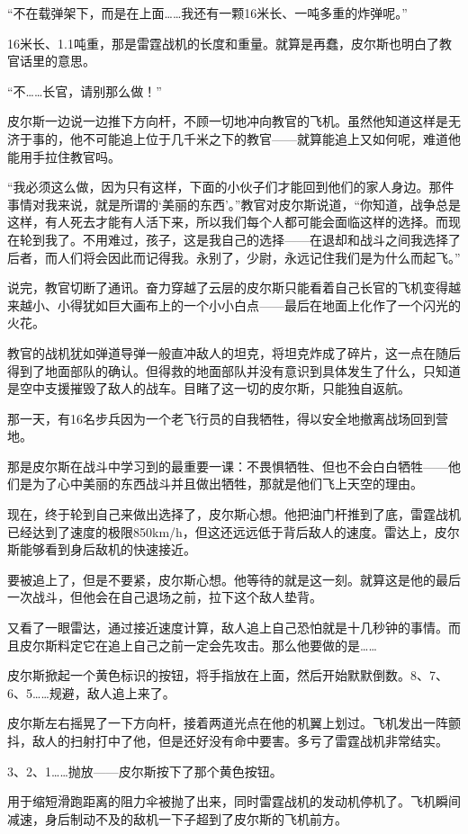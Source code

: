 “不在载弹架下，而是在上面……我还有一颗16米长、一吨多重的炸弹呢。”

16米长、1.1吨重，那是雷霆战机的长度和重量。就算是再蠢，皮尔斯也明白了教官话里的意思。

“不……长官，请别那么做！”

皮尔斯一边说一边推下方向杆，不顾一切地冲向教官的飞机。虽然他知道这样是无济于事的，他不可能追上位于几千米之下的教官——就算能追上又如何呢，难道他能用手拉住教官吗。

“我必须这么做，因为只有这样，下面的小伙子们才能回到他们的家人身边。那件事情对我来说，就是所谓的‘美丽的东西’。”教官对皮尔斯说道，“你知道，战争总是这样，有人死去才能有人活下来，所以我们每个人都可能会面临这样的选择。而现在轮到我了。不用难过，孩子，这是我自己的选择——在退却和战斗之间我选择了后者，而人们将会因此而记得我。永别了，少尉，永远记住我们是为什么而起飞。”

说完，教官切断了通讯。奋力穿越了云层的皮尔斯只能看着自己长官的飞机变得越来越小、小得犹如巨大画布上的一个小小白点——最后在地面上化作了一个闪光的火花。

教官的战机犹如弹道导弹一般直冲敌人的坦克，将坦克炸成了碎片，这一点在随后得到了地面部队的确认。但得救的地面部队并没有意识到具体发生了什么，只知道是空中支援摧毁了敌人的战车。目睹了这一切的皮尔斯，只能独自返航。

那一天，有16名步兵因为一个老飞行员的自我牺牲，得以安全地撤离战场回到营地。

那是皮尔斯在战斗中学习到的最重要一课：不畏惧牺牲、但也不会白白牺牲——他们是为了心中美丽的东西战斗并且做出牺牲，那就是他们飞上天空的理由。

现在，终于轮到自己来做出选择了，皮尔斯心想。他把油门杆推到了底，雷霆战机已经达到了速度的极限850km/h，但这还远远低于背后敌人的速度。雷达上，皮尔斯能够看到身后敌机的快速接近。

要被追上了，但是不要紧，皮尔斯心想。他等待的就是这一刻。就算这是他的最后一次战斗，但他会在自己退场之前，拉下这个敌人垫背。

又看了一眼雷达，通过接近速度计算，敌人追上自己恐怕就是十几秒钟的事情。而且皮尔斯料定它在追上自己之前一定会先攻击。那么他要做的是……

皮尔斯掀起一个黄色标识的按钮，将手指放在上面，然后开始默默倒数。8、7、6、5……规避，敌人追上来了。

皮尔斯左右摇晃了一下方向杆，接着两道光点在他的机翼上划过。飞机发出一阵颤抖，敌人的扫射打中了他，但是还好没有命中要害。多亏了雷霆战机非常结实。

3、2、1……抛放——皮尔斯按下了那个黄色按钮。

用于缩短滑跑距离的阻力伞被抛了出来，同时雷霆战机的发动机停机了。飞机瞬间减速，身后制动不及的敌机一下子超到了皮尔斯的飞机前方。

